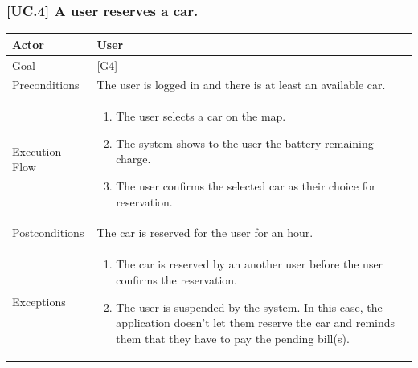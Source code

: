 \documentclass[english]{article}
\begin{document}
	\subsubsection{[UC.4] A user reserves a car.}
	\begin{tabularx}{\textwidth}{  l  X  }
		\hline
		Actor & User\\
		\hline
		Goal & [G4]\\
		\hline
		Preconditions & The user is logged in and there is at least an available car.\\
		\hline
		Execution Flow & \begin{enumerate}
			\item{The user selects a car on the map.}
			\item{The system shows to the user the battery remaining charge.}
			\item{The user confirms the selected car as their choice for reservation.}
		\end{enumerate}\\
		\hline
		Postconditions & The car is reserved for the user for an hour. \\
		\hline
		Exceptions & \begin{enumerate}
			\item{The car is reserved by an another user before the user confirms the reservation.}
			\item{The user is suspended by the system. In this case, the application doesn't let them reserve the car and reminds them that they have to pay the pending bill(s).}
		\end{enumerate}\\
		\hline
	\end{tabularx}
\end{document}
